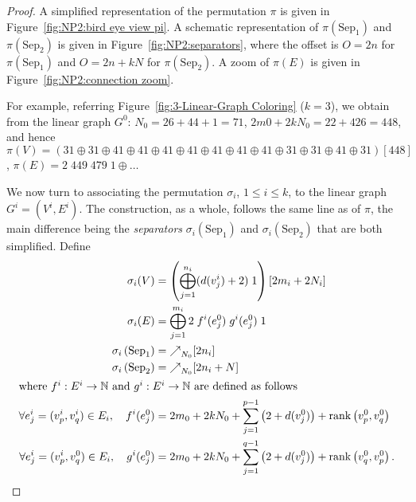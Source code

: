 \begin{proof}
  
  
  

  A simplified representation of the permutation $\pi$ is given in
  Figure~\ref{fig:NP2:bird eye view pi}.
  A schematic representation of $\pi(\text{Sep}_1)$ and $\pi(\text{Sep}_2)$
  is given in Figure~\ref{fig:NP2:separators}, where the offset is $O=2n$ for
  $\pi(\text{Sep}_1)$ and $O=2n+kN$ for $\pi(\text{Sep}_2)$.
  A zoom of $\pi(E)$ is given in Figure~\ref{fig:NP2:connection zoom}.

  For example, referring Figure~\ref{fig:3-Linear-Graph Coloring} ($k=3$), we
  obtain from the linear graph $G^0$:
  $N_0 = 26 + 44 + 1 = 71$, $2m0+2kN_0= 22 + 426 = 448$, and hence
  $\pi(V) = \left(3 1 \oplus 3 1 \oplus 4 1 \oplus 4 1 \oplus 4 1 \oplus
  4 1 \oplus 4 1 \oplus 4 1 \oplus 4 1 \oplus 3 1 \oplus 3 1 \oplus 4 1 \oplus 3 1\right) [448]$,
  $\pi(E) = 2\;449\;479\;1 \oplus \dots$

  We now turn to associating the permutation $\sigma_i$, $1 \leq i \leq k$,
  to the linear graph $G^i = (V^i, E^i)$.
  The construction, as a whole, follows the same line as of $\pi$,
  the main difference being the \emph{separators}
  $\sigma_i\left(\text{Sep}_1\right)$ and
  $\sigma_i\left(\text{Sep}_2\right)$ that are both simplified.
  Define
  \begin{align*}
    \sigma_i(V)
    &=
    \left(\bigoplus_{j=1}^{n_i} (d(v^i_j)+2) \; 1\right) [2m_i+2N_i]
    \\
    \sigma_i(E)
    &=
    \bigoplus_{j=1}^{m_i} 2 \; f^i(e^0_j) \; g^i(e^0_j) \; 1
    \\
    \sigma_i\left(\text{Sep}_1\right)
    &=
    \mathbf{\nearrow}_{N_0} [2n_i]
    \\
    \sigma_i\left(\text{Sep}_2\right)
    &=
    \mathbf{\nearrow}_{N_0} [2n_i+N]
    \\
    \intertext{where $f^i : E^i \to \mathbb{N}$ and $g^i : E^i \to \mathbb{N}$
    are defined as follows}
    \forall e^i_j = (v^i_p, v^i_q) \in E_i,\quad f^i(e^0_j)
    &=
    2m_0 + 2kN_0 + \sum_{j=1}^{p-1}\left(2+d(v^0_j)\right) + \operatorname{rank}\left(v^0_p, v^0_q\right)
    \\
    \forall e^i_j = (v^i_p, v^0_q) \in E_i,\quad g^i(e^0_j)
    &=
    2m_0 + 2kN_0 + \sum_{j=1}^{q-1}\left(2+d(v^0_j)\right) + \operatorname{rank}\left(v^0_q, v^0_p\right)\text{.}
    \end{align*}


\end{proof}
